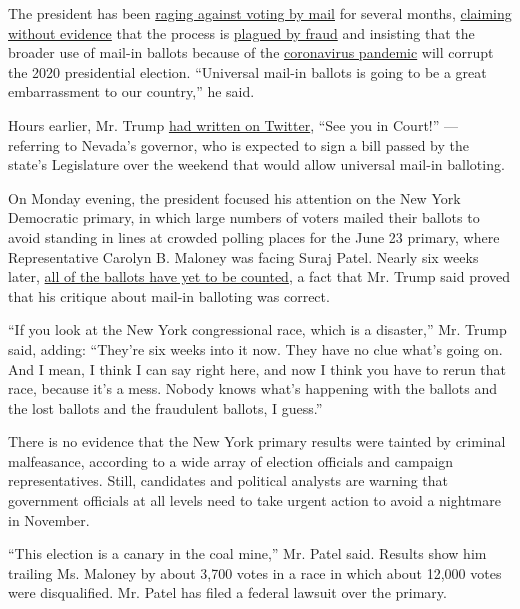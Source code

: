 The president has been
\href{https://www.nytimes3xbfgragh.onion/2020/06/24/us/politics/trump-vote-by-mail.html}{raging
against voting by mail} for several months,
\href{https://www.nytimes3xbfgragh.onion/article/mail-in-voting-explained.html}{claiming
without evidence} that the process is
\href{https://www.nytimes3xbfgragh.onion/2020/07/31/us/politics/trump-mail-voting-fraud.html}{plagued
by fraud} and insisting that the broader use of mail-in ballots because
of the
\href{https://www.nytimes3xbfgragh.onion/interactive/2020/us/coronavirus-us-cases.html}{coronavirus
pandemic} will corrupt the 2020 presidential election. ``Universal
mail-in ballots is going to be a great embarrassment to our country,''
he said.

Hours earlier, Mr. Trump
\href{https://twitter.com/realDonaldTrump/status/1290250416278532096?s=20}{had
written on Twitter}, ``See you in Court!'' --- referring to Nevada's
governor, who is expected to sign a bill passed by the state's
Legislature over the weekend that would allow universal mail-in
balloting.

On Monday evening, the president focused his attention on the New York
Democratic primary, in which large numbers of voters mailed their
ballots to avoid standing in lines at crowded polling places for the
June 23 primary, where Representative Carolyn B. Maloney was facing
Suraj Patel. Nearly six weeks later,
\href{https://www.nytimes3xbfgragh.onion/2020/08/03/nyregion/nyc-mail-ballots-voting.html}{all
of the ballots have yet to be counted}, a fact that Mr. Trump said
proved that his critique about mail-in balloting was correct.

``If you look at the New York congressional race, which is a disaster,''
Mr. Trump said, adding: ``They're six weeks into it now. They have no
clue what's going on. And I mean, I think I can say right here, and now
I think you have to rerun that race, because it's a mess. Nobody knows
what's happening with the ballots and the lost ballots and the
fraudulent ballots, I guess.''

There is no evidence that the New York primary results were tainted by
criminal malfeasance, according to a wide array of election officials
and campaign representatives. Still, candidates and political analysts
are warning that government officials at all levels need to take urgent
action to avoid a nightmare in November.

``This election is a canary in the coal mine,'' Mr. Patel said. Results
show him trailing Ms. Maloney by about 3,700 votes in a race in which
about 12,000 votes were disqualified. Mr. Patel has filed a federal
lawsuit over the primary.

